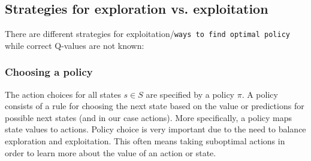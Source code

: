 \documentclass[11pt]{article}
\begin{document}
\subsection{Strategies for exploration vs. exploitation}
There are different strategies for exploitation/\texttt{ways to find optimal policy} while correct Q-values are not known:
\subsubsection{Choosing a policy}
The action choices for all states $s \in S$ are specified by a policy $\pi$. A policy consists of a rule for choosing the next state based on the value or predictions for possible next states (and in our case actions). More specifically, a policy maps state values to actions. Policy choice is very important due to the need to balance exploration and exploitation. 
This often means taking suboptimal actions in order to learn more about the value of an action or state. 
\end{document}

